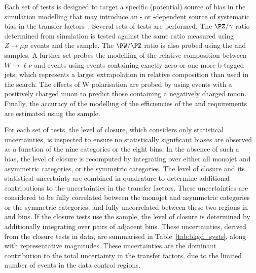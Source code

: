 Each set of tests is designed to target a specific (potential) source
of bias in the simulation modelling that may introduce an \njet- or
\scalht-dependent source of systematic bias in the transfer
factors~\cite{RA1Paper2012}. Several sets of tests are performed. The
$\PZ/\gamma$ ratio determined from simulation is tested against the
same ratio measured using $Z\rightarrow\mu\mu$ events and the \gj sample. The
$\PW/\PZ$ ratio is also probed using the \mj and \mmj samples. A
further set probes the modelling of the relative composition between
$W\rightarrow\ell\nu$ and \ttbar events using \mj events containing exactly zero or
one more b-tagged jets, which represents a larger extrapolation in
relative composition than used in the search.  The effects of W
polarisation are probed by using \mj events with a positively charged
muon to predict those containing a negatively charged muon. Finally,
the accuracy of the modelling of the efficiencies of the \alphat and
\bdphi requirements are estimated using the \mj sample. 

For each set of tests, the level of closure, which considers only
statistical uncertainties, is inspected to ensure no statistically
significant biases are observed as a function of the nine \njet
categories or the eight \scalht bins. In the absence of such a bias,
the level of closure is recomputed by integrating over either all
monojet and asymmetric \njet categories, or the symmetric \njet
categories. The level of closure and its statistical uncertainty are
combined in quadrature to determine additional contributions to the
uncertainties in the transfer factors. These uncertainties are
considered to be fully correlated between the monojet and asymmetric
\njet categories or the symmetric \njet categories, and fully
uncorrelated between these two regions in \njet and \scalht bins. If
the closure tests use the \mmj sample, the level of closure is
determined by additionally integrating over pairs of adjacent \scalht
bins. These uncertainties, derived from the closure tests in data, are
summarised in Table~\ref{tab:bkgd_systs}, along with representative
magnitudes. These uncertainties are the dominant contribution to the
total uncertainty in the transfer factors, due to the limited number
of events in the data control regions.

